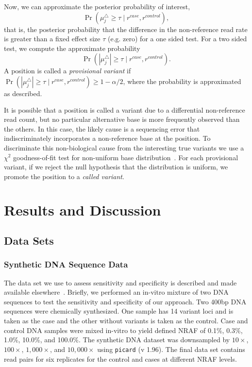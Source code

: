 \documentclass{bmcart}
\begin{document}
Now, we can approximate the posterior probability of interest,
\begin{equation}
  \Pr( \mu_j^{\triangle} \geq \tau \mid r^{case}, r^{control} ),
\end{equation}
that is, the posterior probability that the difference in the non-reference read rate is greater than a fixed effect size $\tau$ (e.g. zero) for a one sided test.
For a two sided test, we compute the approximate probability
\begin{equation}
  \Pr( | \mu_j^{\triangle} | \geq \tau \mid r^{case}, r^{control}).
\end{equation}
A position is called a \textit{provisional variant} if $\Pr( | \mu_j^{\triangle} | \geq \tau \mid r^{case}, r^{control}) \geq 1-\alpha/2$, where the probability is approximated as described.

It is possible that a position is called a variant due to a differential non-reference read count, but no particular alternative base is more frequently observed than the others.
In this case, the likely cause is a sequencing error that indiscriminately incorporates a non-reference base at the position.
To discriminate this non-biological cause from the interesting true variants we use a $\chi^2$ goodness-of-fit test for non-uniform base distribution~\cite{efron2010large, he2015rvd2}.
For each provisional variant, if we reject the null hypothesis that the distribution is uniform, we promote the position to a \textit{called variant}.


\section{Results and Discussion}

\subsection{Data Sets}

\subsubsection{Synthetic DNA Sequence Data}

The data set we use to assess sensitivity and specificity is described and made available elsewhere~\cite{flaherty2011ultrasensitive}.
Briefly, we performed an in-vitro mixture of two DNA sequences to test the sensitivity and specificity of our approach.
Two 400bp DNA sequences were chemically synthesized. 
One sample has 14 variant loci and is taken as the case and the other without variants is taken as the control.
Case and control DNA samples were mixed in-vitro to yield defined NRAF of 0.1\%, 0.3\%, 1.0\%, 10.0\%, and 100.0\%.
The synthetic DNA dataset was downsampled by $10\times$, $100\times$, $1,000\times$, and $10,000\times$ using \texttt{picard} (v 1.96).
The final data set contains read pairs for six replicates for the control and cases at different NRAF levels.
\end{document}
